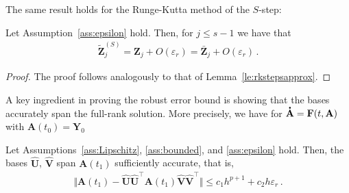 \documentclass[preprint,runningheads]{svjour3}
\newcommand*{\dt}[1]{ \accentset{\mbox{\large\bfseries .}}{#1}}
\def\wh{\widehat}
\newcommand\bfA{{\mathbf A}}
\newcommand\bfF{{\mathbf F}}
\newcommand\bfU{{\mathbf U}}
\newcommand\bfV{{\mathbf V}}
\newcommand\bfY{{\mathbf Y}}
\newcommand\bfZ{{\mathbf Z}}
\begin{document}
The same result holds for the Runge-Kutta method of the $S$-step:
\begin{lemma}\label{le:rkstepsapproxS}
Let Assumption~\ref{ass:epsilon} hold. Then, for $j\leq s-1$ we have that
    \begin{align}\label{eq:leRKcloseness}
        \widetilde \bfZ_j^{(S)} = \bfZ_j + O(\varepsilon_r) = \bar \bfZ_j + O(\varepsilon_r)\,.
    \end{align}
\end{lemma}
\begin{proof}
    The proof follows analogously to that of Lemma~\ref{le:rkstepsapprox}.
\end{proof}

A key ingredient in proving the robust error bound is showing that the bases accurately span the full-rank solution. More precisely, we have for $\dt\bfA = \bfF(t,\bfA)$ with $\bfA(t_0) = \bfY_0$
\begin{lemma}\label{le:suff_acc_basis}
    Let Assumptions~\ref{ass:Lipschitz}, \ref{ass:bounded}, and \ref{ass:epsilon} hold. Then, the bases $\wh \bfU$, $\wh \bfV$ span $\bfA(t_1)$ sufficiently accurate, that is,
    \begin{align*}
        \Vert \bfA(t_1) - \wh \bfU\wh \bfU^{\top}\bfA(t_1)\wh \bfV\wh \bfV^{\top} \Vert \leq c_1h^{p+1} + c_2h\varepsilon_r\,.
    \end{align*}
\end{lemma}
\end{document}
